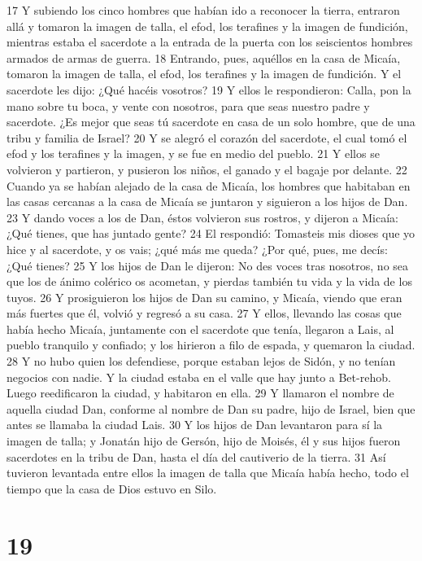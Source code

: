 17 Y subiendo los cinco hombres que habían ido a reconocer la tierra, entraron allá y tomaron la imagen de talla, el efod, los terafines y la imagen de fundición, mientras estaba el sacerdote a la entrada de la puerta con los seiscientos hombres armados de armas de guerra.
18 Entrando, pues, aquéllos en la casa de Micaía, tomaron la imagen de talla, el efod, los terafines y la imagen de fundición. Y el sacerdote les dijo: ¿Qué hacéis vosotros?
19 Y ellos le respondieron: Calla, pon la mano sobre tu boca, y vente con nosotros, para que seas nuestro padre y sacerdote. ¿Es mejor que seas tú sacerdote en casa de un solo hombre, que de una tribu y familia de Israel?
20 Y se alegró el corazón del sacerdote, el cual tomó el efod y los terafines y la imagen, y se fue en medio del pueblo.
21 Y ellos se volvieron y partieron, y pusieron los niños, el ganado y el bagaje por delante.
22 Cuando ya se habían alejado de la casa de Micaía, los hombres que habitaban en las casas cercanas a la casa de Micaía se juntaron y siguieron a los hijos de Dan.
23 Y dando voces a los de Dan, éstos volvieron sus rostros, y dijeron a Micaía: ¿Qué tienes, que has juntado gente?
24 El respondió: Tomasteis mis dioses que yo hice y al sacerdote, y os vais; ¿qué más me queda? ¿Por qué, pues, me decís: ¿Qué tienes?
25 Y los hijos de Dan le dijeron: No des voces tras nosotros, no sea que los de ánimo colérico os acometan, y pierdas también tu vida y la vida de los tuyos.
26 Y prosiguieron los hijos de Dan su camino, y Micaía, viendo que eran más fuertes que él, volvió y regresó a su casa.
27 Y ellos, llevando las cosas que había hecho Micaía, juntamente con el sacerdote que tenía, llegaron a Lais, al pueblo tranquilo y confiado; y los hirieron a filo de espada, y quemaron la ciudad.
28 Y no hubo quien los defendiese, porque estaban lejos de Sidón, y no tenían negocios con nadie. Y la ciudad estaba en el valle que hay junto a Bet-rehob. Luego reedificaron la ciudad, y habitaron en ella.
29 Y llamaron el nombre de aquella ciudad Dan, conforme al nombre de Dan su padre, hijo de Israel, bien que antes se llamaba la ciudad Lais.
30 Y los hijos de Dan levantaron para sí la imagen de talla; y Jonatán hijo de Gersón, hijo de Moisés, él y sus hijos fueron sacerdotes en la tribu de Dan, hasta el día del cautiverio de la tierra.
31 Así tuvieron levantada entre ellos la imagen de talla que Micaía había hecho, todo el tiempo que la casa de Dios estuvo en Silo.

\chapter{19}

